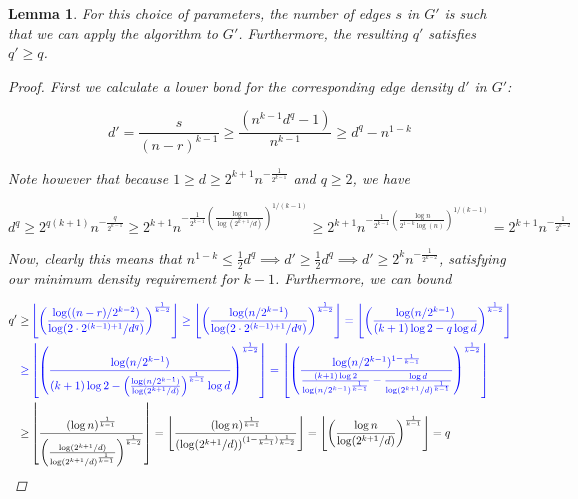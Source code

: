 \documentclass[12pt]{article}
\newtheorem{lemma}[thm]{Lemma}
\begin{document}
    \begin{lemma} \label{lemma:q_prime}
        For this choice of parameters, the number of edges $s$ in $G'$
        is such that we can apply the algorithm to $G'$.
        Furthermore, the resulting $q'$ satisfies $q' \geq q$.

        \begin{proof}

            First we calculate a lower bond for the corresponding edge density $d'$ in $G'$:

            \begin{equation*}
                d' = \frac{s}{(n-r)^{k-1}} \geq \frac{\left(  n^{k-1} d^{q} - 1\right)}{n^{k-1}}
                \geq d^q - n^{1-k}
            \end{equation*}

            Note however that because $1 \geq d \geq 2^{k+1} n^{-\frac{1}{2^{k-1}}}$ and $q \geq 2$, we have

            \[
                d^q \geq 2^{q(k+1)}n^{-\frac{q}{2^{k-1}}} \geq
                2^{k+1} n^{-\frac{1}{2^{k-1}} \left( \frac{\log n}{\log (2^{k+1}/d)} \right)^{1/(k-1)}}
                \geq 2^{k+1} n^{-\frac{1}{2^{k-1}} \left( \frac{\log n}{2^{1-k} \log (n)} \right)^{1/(k-1)}}
                = 2^{k+1}n^{-\frac{1}{2^{k-2}}}
            \]

            Now, clearly this means that $n^{1-k} \leq \frac{1}{2} d^q \implies d' \geq \frac{1}{2}d^q
            \implies d' \geq 2^{k}n^{-\frac{1}{2^{k-2}}}$,
            satisfying our minimum density requirement for $k-1$.
            Furthermore, we can bound


            \begin{align*}
                q' \geq &
                \color{blue} \left\lfloor \left(  \frac{\log ((n-r)/2^{k-2})}{\log (2 \cdot 2^{(k-1)+1}/d^q)} \right)^{\frac{1}{k-2}} \right\rfloor
                \geq \left\lfloor \left(  \frac{\log (n/2^{k-1})}{\log (2 \cdot 2^{(k-1)+1}/d^q)} \right)^{\frac{1}{k-2}} \right\rfloor =
                \left\lfloor \left(  \frac{\log (n / 2^{k-1})}{(k+1) \log 2 - q \log d} \right)^{\frac{1}{k-2}} \right\rfloor \\
                \color {blue}\geq &
                \color {blue} \left\lfloor \left(  \frac{\log (n / 2^{k-1})}{(k+1) \log 2 - \left(  \frac{\log (n / 2^{k-1})}{\log (2^{k+1}/d)} \right)^{\frac{1}{k-1}}  \log d} \right)^{\frac{1}{k-2}} \right\rfloor
                =
                \left\lfloor \left(  \frac{\log (n / 2^{k-1})^{1-\frac{1}{k-1}}}{\frac{(k+1) \log 2}{\log(n / 2^{k-1})^{\frac{1}{k-1}}} - \frac{\log d}{\log (2^{k+1}/d)^{\frac{1}{k-1}}} } \right)^{\frac{1}{k-2}} \right\rfloor \\
                \geq &
                \left\lfloor  \frac{(\log n)^{\frac{
                    1}{k-1}}}{\left(\frac{\log (2^{k+1}/d)}{\log (2^{k+1}/d)^{\frac{1}{k-1}}} \right)^{\frac{1}{k-2}} } \right\rfloor
                = \left\lfloor  \frac{(\log n)^{\frac{1}{k-1}}}{\left(\log (2^{k+1}/d)\right)^{(1-\frac{1}{k-1})\frac{1}{k-2}}} \right\rfloor
                = \left\lfloor \left(  \frac{\log n}{\log (2^{k+1}/d)} \right)^{\frac{1}{k-1}} \right\rfloor = q
            \end{align*}


\end{proof}
\end{lemma}
\end{document}
